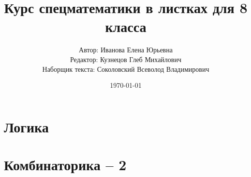 \documentclass[11pt,a4paper]{report}
\title{Курс спецматематики в листках для 8 класса}
\author{Автор: Иванова Елена Юрьевна\\
	Редактор: Кузнецов Глеб Михайлович\\
	Наборщик текста: Соколовский Всеволод Владимирович}
\date{\today}
\theoremstyle{myrmk}
\theoremstyle{mypln}
\theoremstyle{mydfn}
\theoremstyle{myques}
\begin{document}
\maketitle
\tableofcontents
\newpage

\chapter{Логика}




\chapter{Комбинаторика -- 2}







\end{document}
